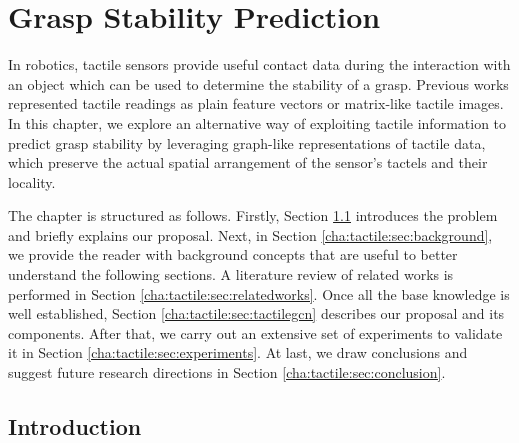 \chapter{Grasp Stability Prediction}
\label{cha:tactile}

\begin{chapterabstract}
    In robotics, tactile sensors provide useful contact data during the interaction with an object which can be used to determine the stability of a grasp. Previous works represented tactile readings as plain feature vectors or matrix-like tactile images. In this chapter, we explore an alternative way of exploiting tactile information to predict grasp stability by leveraging graph-like representations of tactile data, which preserve the actual spatial arrangement of the sensor's tactels and their locality.

    The chapter is structured as follows. Firstly, Section \ref{cha:tactile:sec:introduction} introduces the problem and briefly explains our proposal. Next, in Section \ref{cha:tactile:sec:background}, we provide the reader with background concepts that are useful to better understand the following sections. A literature review of related works is performed in Section \ref{cha:tactile:sec:relatedworks}. Once all the base knowledge is well established, Section \ref{cha:tactile:sec:tactilegcn} describes our proposal and its components. After that, we carry out an extensive set of experiments to validate it in Section \ref{cha:tactile:sec:experiments}. At last, we draw conclusions and suggest future research directions in Section \ref{cha:tactile:sec:conclusion}.
\end{chapterabstract}

\minitoc

\clearpage

\section{Introduction}
\label{cha:tactile:sec:introduction}


